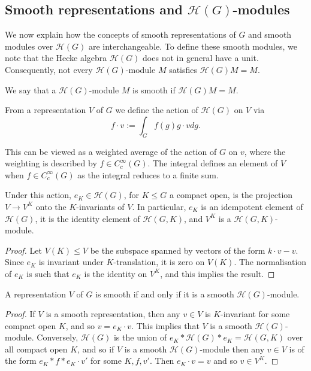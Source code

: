 \subsection{Smooth representations and \texorpdfstring{$\mathcal H(G)$}{TEXT}-modules}

We now explain how the concepts of smooth representations of $G$ and smooth modules over $\mathcal H(G)$ are interchangeable. To define these smooth modules, we note that the Hecke algebra $\mathcal H(G)$ does not in general have a unit. Consequently, not every $\mathcal H(G)$-module $M$ satisfies $\mathcal H(G) M = M$. 

\begin{defn}
    We say that a $\mathcal H(G)$-module $M$ is smooth if $\mathcal H(G) M = M$. 
\end{defn}

\begin{defn}
From a representation $V$ of $G$ we define the action of $\mathcal H(G)$ on $V$ via 
$$f \cdot v := \int_G f(g) g \cdot v dg.$$
\end{defn}
This can be viewed as a weighted average of the action of $G$ on $v$, where the weighting is described by $f \in C_c^\infty(G)$. The integral defines an element of $V$ when $f \in C_c^\infty(G)$ as the integral reduces to a finite sum.

\begin{lemma}\label{project}
    Under this action, $e_K \in \mathcal H(G)$, for $K\leq G$ a compact open, is the projection $V \to V^K$ onto the $K$-invariants of $V$. In particular, $e_K$ is an idempotent element of $\mathcal H(G)$, it is the identity element of $\mathcal H(G,K)$, and $V^K$ is a $\mathcal H(G,K)$-module.
\end{lemma}
\begin{proof}
    Let $V(K) \leq V$ be the subspace spanned by vectors of the form $k \cdot v-v$. Since $e_K$ is invariant under $K$-translation, it is zero on $V(K)$. The normalisation of $e_K$ is such that $e_K$ is the identity on $V^K$, and this implies the result.
\end{proof}


\begin{prop}
    A representation $V$ of $G$ is smooth if and only if it is a smooth $\mathcal H(G)$-module.
\end{prop}
\begin{proof}
If $V$ is a smooth representation, then any $v \in V$ is $K$-invariant for some compact open $K$, and so $v=e_K \cdot v$. This implies that $V$ is a smooth $\mathcal H(G)$-module. Conversely, $\mathcal H(G)$ is the union of $e_K* \mathcal H(G) *e_K = \mathcal H(G,K)$ over all compact open $K$, and so if $V$ is a smooth $\mathcal H(G)$-module then any $v \in V$ is of the form $e_K * f * e_K \cdot v'$ for some $K, f, v'$. Then $e_K \cdot v=v$ and so $v \in V^K$.
\end{proof}

